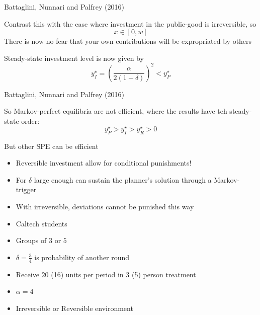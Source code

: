 \documentclass{beamer}
\begin{document}
\begin{frame}{Battaglini, Nunnari and Palfrey (2016)}
	\begin{card}
	Contrast this with the case where investment in the public-good is irreversible, so
		$$x\in\left[0,w\right]$$ \pause
	There is now no fear that your own contributions will be expropriated by others
	\end{card}
		\pause
	\begin{card}
	Steady-state investment level is now given by $$y^\star_I=\left(\dfrac{\alpha}{2(1-\delta)}\right)^2<y^\star_P$$
	\end{card}
\end{frame}


\begin{frame}{Battaglini, Nunnari and Palfrey (2016)}
\begin{card}
So Markov-perfect equilibria are not efficient, where the results have teh steady-state order: 
$$ y^\star_P>y^\star_I>y^\star_R>0$$
\end{card} \pause
\begin{card} But other SPE can be efficient
		\begin{itemize}
    		\item Reversible investment allow for conditional punishments!
    		\item For $\delta$ large enough can sustain the planner's solution through a Markov-trigger
    		\item With irreversible, deviations cannot be punished this way
	\end{itemize}
	\end{card}
\end{frame}


\begin{frame}
\begin{card}
	\begin{itemize}
		\item Caltech students
		\item Groups of $3$ or $5$
		\item $\delta=\tfrac{3}{4}$ is probability of another round
		\item Receive $20$ (16) units per period in 3 (5) person treatment
		\item $\alpha=4$
		\item Irreversible or Reversible environment
	\end{itemize}
	\end{card}
\end{frame}
\end{document}
